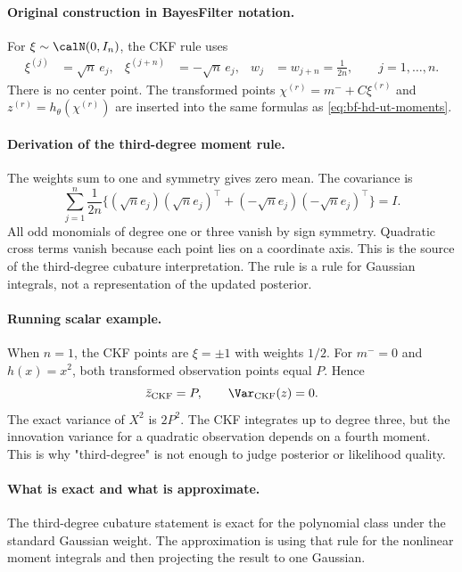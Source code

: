 \paragraph{Original construction in BayesFilter notation.}
For \(\xi\sim\calN(0,I_n)\), the CKF rule uses
\begin{align}
  \xi^{(j)}&=\sqrt n\,e_j,&
  \xi^{(j+n)}&=-\sqrt n\,e_j,&
  w_j&=w_{j+n}=\frac{1}{2n},
  \qquad j=1,\ldots,n .
  \label{eq:bf-hd-ckf-points}
\end{align}
There is no center point.  The transformed points
\(\chi^{(r)}=m^-+C\xi^{(r)}\) and \(z^{(r)}=h_\theta(\chi^{(r)})\) are inserted
into the same formulas as \eqref{eq:bf-hd-ut-moments}.

\paragraph{Derivation of the third-degree moment rule.}
The weights sum to one and symmetry gives zero mean.  The covariance is
\[
  \sum_{j=1}^n \frac{1}{2n}
  \{(\sqrt n e_j)(\sqrt n e_j)^\top
    +(-\sqrt n e_j)(-\sqrt n e_j)^\top\}
  =I .
\]
All odd monomials of degree one or three vanish by sign symmetry.  Quadratic
cross terms vanish because each point lies on a coordinate axis.  This is the
source of the third-degree cubature interpretation.  The rule is a rule for
Gaussian integrals, not a representation of the updated posterior.

\paragraph{Running scalar example.}
When \(n=1\), the CKF points are \(\xi=\pm1\) with weights \(1/2\).  For
\(m^-=0\) and \(h(x)=x^2\), both transformed observation points equal \(P\).
Hence
\[
  \bar z_{\rm CKF}=P,\qquad
  \Var_{\rm CKF}(z)=0.
\]
The exact variance of \(X^2\) is \(2P^2\).  The CKF integrates up to degree
three, but the innovation variance for a quadratic observation depends on a
fourth moment.  This is why "third-degree" is not enough to judge posterior or
likelihood quality.

\paragraph{What is exact and what is approximate.}
The third-degree cubature statement is exact for the polynomial class under the
standard Gaussian weight.  The approximation is using that rule for the
nonlinear moment integrals and then projecting the result to one Gaussian.

